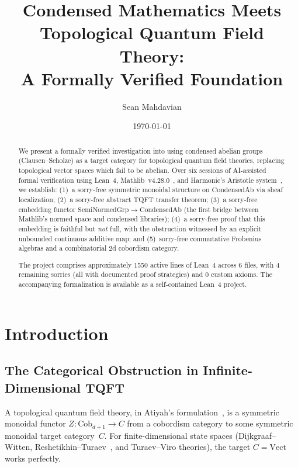 \documentclass[11pt]{amsart}
\title[Liquid TQFT]{Condensed Mathematics Meets Topological Quantum Field Theory:\\A Formally Verified Foundation}
\author{Sean Mahdavian}
\date{\today}
\theoremstyle{plain}
\theoremstyle{definition}
\newcommand{\Cob}{\mathrm{Cob}}
\newcommand{\Vect}{\mathrm{Vect}}
\newcommand{\CondAb}{\mathrm{CondensedAb}}
\newcommand{\SemiNormedGrp}{\mathrm{SemiNormedGrp}}
\begin{document}
\begin{abstract}
We present a formally verified investigation into using condensed abelian groups (Clausen--Scholze) as a target category for topological quantum field theories, replacing topological vector spaces which fail to be abelian. Over six sessions of AI-assisted formal verification using Lean~4, Mathlib~v4.28.0~\cite{Mathlib}, and Harmonic's Aristotle system~\cite{Aristotle2025}, we establish: (1)~a sorry-free symmetric monoidal structure on $\CondAb$ via sheaf localization; (2)~a sorry-free abstract TQFT transfer theorem; (3)~a sorry-free embedding functor $\SemiNormedGrp \to \CondAb$ (the first bridge between Mathlib's normed space and condensed libraries); (4)~a sorry-free proof that this embedding is faithful but \emph{not} full, with the obstruction witnessed by an explicit unbounded continuous additive map; and (5)~sorry-free commutative Frobenius algebras and a combinatorial 2d cobordism category.

The project comprises approximately 1550 active lines of Lean~4 across 6 files, with 4 remaining sorries (all with documented proof strategies) and 0 custom axioms. The accompanying formalization is available as a self-contained Lean~4 project.
\end{abstract}



\maketitle

\tableofcontents

\section{Introduction}
\label{sec:intro}

\subsection{The Categorical Obstruction in Infinite-Dimensional TQFT}

A topological quantum field theory, in Atiyah's formulation~\cite{Atiyah1988}, is a symmetric monoidal functor $Z : \Cob_{d+1} \to C$ from a cobordism category to some symmetric monoidal target category~$C$. For finite-dimensional state spaces (Dijkgraaf--Witten, Reshetikhin--Turaev~\cite{ReshetikhinTuraev1991}, and Turaev--Viro theories), the target $C = \Vect$ works perfectly.
\end{document}
